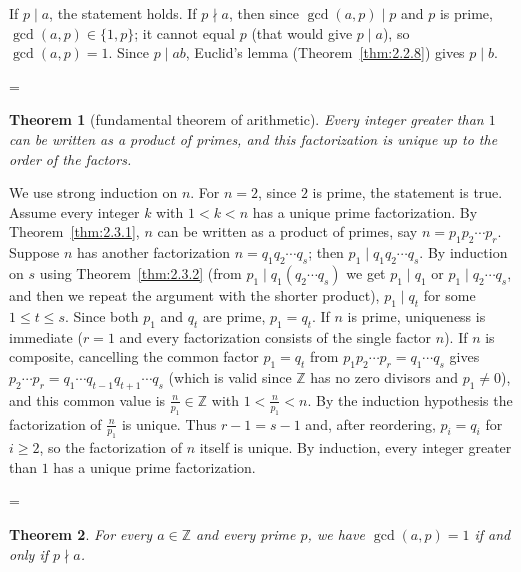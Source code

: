 \documentclass[11pt]{article}
\makeatletter
\theoremstyle{ntstyle}
\newtheorem{theorem}{Theorem}[subsection]
\let\nt@closedisplay\]
\def\nt@guardedclose{\@ifnextchar\par{\nt@closeafterpar}{\@ifnextchar\end{\postdisplaypenalty\@M\nt@closedisplay}{\nt@closedisplay}}}
\def\nt@closeafterpar\par{\@ifnextchar\par{\nt@closeafterpar}{\@ifnextchar\end{\postdisplaypenalty\@M\nt@closedisplay\par}{\nt@closedisplay\par}}}
\renewenvironment{proof}[1][\proofname]{\par
  \pushQED{\qed}\normalfont\topsep\medskipamount\edef\nt@afterproof{\@endparpenalty=\the\@endparpenalty\relax}\@beginparpenalty\@M\@endparpenalty\@M\let\]\nt@guardedclose\trivlist\item[]\textit{#1\@addpunct{.}} \ignorespaces}{\ifvmode\addpenalty\@M\fi\popQED\nt@afterproof\endtrivlist\@endpefalse}
\makeatother
\begin{document}
\begin{proof} If $p \mid a$, the statement holds. If $p
		\nmid a$, then since $\gcd(a, p) \mid p$ and $p$ is prime, $\gcd(a, p)
		\in \{1, p\}$; it cannot equal $p$ (that would give $p \mid a$), so
	$\gcd(a, p)=1$. Since $p \mid ab$, Euclid's lemma (Theorem~\ref{thm:2.2.8}) gives
	$p \mid b$.

\end{proof}
\begin{theorem}[fundamental theorem of arithmetic]\label{thm:2.3.3}
	Every integer greater than $1$ can be written as a product of primes, and
	this factorization is unique up to the order of the factors.

\end{theorem}

\begin{proof} We use strong induction on $n$. For $n = 2$,
	since $2$ is prime, the statement is true. Assume every integer $k$
	with $1 < k < n$ has a unique prime factorization. By Theorem~\ref{thm:2.3.1}, $n$ can be written as a product of primes, say
	$n=p_1p_2\cdots p_r$. Suppose $n$ has another factorization $n=q_1q_2
		\cdots q_s$; then $p_1 \mid q_1 q_2 \cdots q_s$. By induction on $s$
	using Theorem~\ref{thm:2.3.2} (from $p_1 \mid q_1(q_2 \cdots q_s)$ we get $p_1
		\mid q_1$ or $p_1 \mid q_2 \cdots q_s$, and then we repeat the argument with the shorter
	product), $p_1 \mid q_t$ for some $1 \le t \le s$. Since both $p_1$
	and $q_t$ are prime, $p_1 = q_t$. If $n$ is prime, uniqueness is
	immediate ($r = 1$ and every factorization consists of the single factor $n$). If $n$ is
	composite, cancelling the common factor $p_1 = q_t$ from $p_1 p_2
		\cdots p_r = q_1 \cdots q_s$ gives $p_2 \cdots p_r = q_1 \cdots
		q_{t-1} q_{t+1} \cdots q_s$ (which is valid since $\mathbb{Z}$ has no zero
	divisors and $p_1 \neq 0$), and this common value is $\frac{n}{p_1}
		\in \mathbb{Z}$ with $1 < \frac{n}{p_1} < n$. By the induction
	hypothesis the factorization of $\frac{n}{p_1}$ is unique. Thus $r
		- 1 = s - 1$ and, after reordering, $p_i = q_i$ for $i \ge 2$,
	so the factorization of $n$ itself is unique. By induction, every
	integer greater than $1$ has a unique prime factorization.

\end{proof}
\begin{theorem}\label{thm:2.3.4} For every $a \in \mathbb{Z}$ and every
	prime $p$, we have $\gcd(a, p) = 1$ if and only if $p \nmid a$.

\end{theorem}
\end{document}
